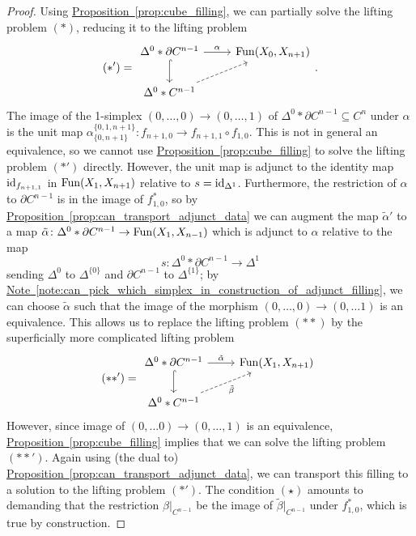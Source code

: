 \documentclass[main.tex]{subfiles}
\begin{document}
\begin{proof}
  Using \hyperref[prop:cube_filling]{Proposition~\ref*{prop:cube_filling}}, we can partially solve the lifting problem $(*)$, reducing it to the lifting problem
  \begin{equation*}
    (*') =
    \begin{tikzcd}
      \Delta^{0} \ast \partial C^{n-1}
      \arrow[r, "\alpha"]
      \arrow[d, hook]
      & \Fun(X_{0}, X_{n+1})
      \\
      \Delta^{0} \ast C^{n-1}
      \arrow[ur, dashed]
    \end{tikzcd}.
  \end{equation*}
  The image of the 1-simplex $(0, \ldots, 0) \to (0, \ldots, 1)$ of $\Delta^{0} \ast \partial C^{n-1} \subseteq C^{n}$ under $\alpha$ is the unit map $\alpha^{\{0, 1, n+1\}}_{\{0, n+1\}}\colon f_{n+1, 0} \to f_{n+1, 1} \circ f_{1, 0}$. This is not in general an equivalence, so we cannot use \hyperref[prop:cube_filling]{Proposition~\ref*{prop:cube_filling}} to solve the lifting problem $(*')$ directly. However, the unit map is adjunct to the identity map $\mathrm{id}_{f_{n+1,1}}$ in $\mathrm{Fun}(X_{1}, X_{n+1})$ relative to $s = \mathrm{id}_{\Delta^{1}}$. Furthermore, the restriction of $\alpha$ to $\partial C^{n-1}$ is in the image of $f^{*}_{1,0}$, so by \hyperref[prop:can_transport_adjunct_data]{Proposition~\ref*{prop:can_transport_adjunct_data}} we can augment the map $\tilde{\alpha}'$ to a map $\tilde{\alpha}\colon \Delta^{0} \ast \partial C^{n-1} \to \mathrm{Fun}(X_{1}, X_{n-1})$ which is adjunct to $\alpha$ relative to the map
  \begin{equation*}
    s\colon \Delta^{0} \ast \partial C^{n-1} \to \Delta^{1}
  \end{equation*}
  sending $\Delta^{0}$ to $\Delta^{\{0\}}$ and $\partial C^{n-1}$ to $\Delta^{\{1\}}$; by \hyperref[note:can_pick_which_simplex_in_construction_of_adjunct_filling]{Note~\ref*{note:can_pick_which_simplex_in_construction_of_adjunct_filling}}, we can choose $\tilde{\alpha}$ such that the image of the morphism $(0, \ldots, 0) \to (0, \ldots 1)$ is an equivalence. This allows us to replace the lifting problem $(**)$ by the superficially more complicated lifting problem
  \begin{equation*}
    (**') =
    \begin{tikzcd}
      \Delta^{0} \ast \partial C^{n-1}
      \arrow[r, "\tilde{\alpha}"]
      \arrow[d, hook]
      & \Fun(X_{1}, X_{n+1})
      \\
      \Delta^{0} \ast C^{n-1}
      \arrow[ur, dashed, swap, "\tilde{\beta}"]
    \end{tikzcd}
  \end{equation*}
  However, since image of $(0, \ldots 0) \to (0, \ldots, 1)$ is an equivalence, \hyperref[prop:cube_filling]{Proposition~\ref*{prop:cube_filling}} implies that we can solve the lifting problem $(**')$. Again using (the dual to) \hyperref[prop:can_transport_adjunct_data]{Proposition~\ref*{prop:can_transport_adjunct_data}}, we can transport this filling to a solution to the lifting problem $(*')$. The condition $(\star)$ amounts to demanding that the restriction $\beta|_{C^{n-1}}$ be the image of $\tilde{\beta}|_{C^{n-1}}$ under $f_{1,0}^{*}$, which is true by construction.
\end{proof}
\end{document}

